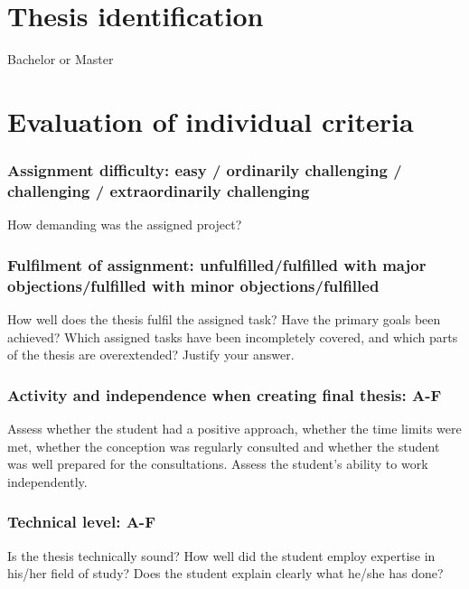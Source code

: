 \documentclass{article}
\date{}
\begin{document}
\section{Thesis identification}
\begin{description}[nosep]
\item[Thesis title:] %
\item[Author’s name:] %
\item[Thesis type:] Bachelor or Master %
\item[Faculty/Department:] %
\item[Supervisor's name:] %
\item[Supervisor's institute:]%
\end{description}

\section{Evaluation of individual criteria}

\subsubsection*{Assignment difficulty: {easy} / {ordinarily challenging} / {challenging} / {extraordinarily challenging}} %
How demanding was the assigned project?

\subsubsection*{Fulfilment of assignment: {unfulfilled}/{fulfilled with major objections}/{fulfilled with minor objections}/{fulfilled}} %
How well does the thesis fulfil the assigned task? Have the primary goals been achieved? Which assigned tasks have been incompletely covered, and which parts of the thesis are overextended? Justify your answer.

\subsubsection*{Activity and independence when creating final thesis: A-F} %
Assess whether the student had a positive approach, whether the time limits were met, whether the conception was regularly consulted and whether the student was well prepared for the consultations. Assess the student’s ability to work independently.

\subsubsection*{Technical level: A-F} %
Is the thesis technically sound? How well did the student employ expertise in his/her field of study? Does the student explain clearly what he/she has done?
\end{document}
